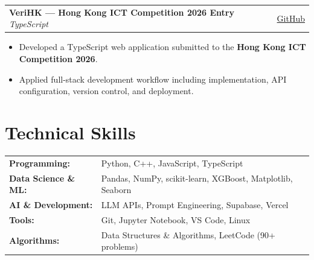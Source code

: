 \documentclass[11pt,a4paper]{article}
\makeatletter
\newcommand{\projectHeading}[3]{
  \begin{tabularx}{\textwidth}{
    @{}X>{\raggedleft\arraybackslash}p{0.25\textwidth}@{}
  }
    \textbf{#1} \enspace\textbar{}\enspace \small\textit{#2} & \small #3
  \end{tabularx}
  \vspace{-2pt}
}
\makeatother
\begin{document}

\projectHeading
  {VeriHK --- Hong Kong ICT Competition 2026 Entry}
  {TypeScript}
  {\href{https://github.com/xinyunfan2-dev/VeriHK-HKICT}{GitHub}}

\begin{itemize}
  \item Developed a TypeScript web application submitted to the \textbf{Hong Kong ICT Competition 2026}.
  \item Applied full-stack development workflow including implementation, API configuration, version control, and deployment.
\end{itemize}



\section{Technical Skills}

\small
\begin{tabular}{@{}p{} p{}@{}}

\textbf{Programming:} &
Python, C++, JavaScript, TypeScript \\[1pt]

\textbf{Data Science \& ML:} &
Pandas, NumPy, scikit-learn, XGBoost, Matplotlib, Seaborn \\[1pt]

\textbf{AI \& Development:} &
LLM APIs, Prompt Engineering, Supabase, Vercel \\[1pt]

\textbf{Tools:} &
Git, Jupyter Notebook, VS Code, Linux \\[1pt]

\textbf{Algorithms:} &
Data Structures \& Algorithms, LeetCode (90+ problems)

\end{tabular}
\normalsize
\end{document}
